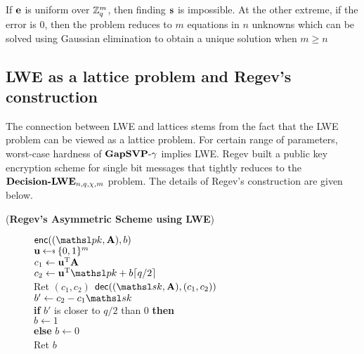\begin{remark}
If $\mathbf{e}$ is uniform over ${{\mathbb Z}}^m_q$, then finding $\mathbf{s}$ is impossible. At the other extreme, if the error is 0, then the problem reduces to $m$ equations in $n$ unknowns which can be solved using Gaussian elimination to obtain a unique solution when $m \geq n$
\end{remark}

\subsection{LWE as a lattice problem and Regev's construction}
The connection between LWE and lattices stems from the fact that 
the LWE problem can be viewed as a lattice problem. For certain range of parameters, worst-case hardness of $\textbf{GapSVP}\textnormal{-}\gamma$ implies LWE. Regev \cite{Regev2005} built a public key encryption scheme for single bit messages that tightly reduces to the $\textbf{Decision-LWE}_{n,q,\chi,m}$ problem. The details of Regev's construction are given below.

\begin{construction}
(\textbf{Regev's Asymmetric Scheme using LWE})
\begin{figure}[h]
\centering
{}
{
    \underline{$\enc((\pk,\varvect{A}), b)$}\\[1pt]
    $\varvect{u} \getsr \bits^m$\\
    $c_1 \gets \mathbf{u}^{\textnormal{T}} \mathbf{A}$\\
    $c_2 \gets \varvect{u}^{\textnormal{T}} \pk + b \lceil q/2 \rceil$\\
    Ret $(c_1, c_2)$
} 
{
    \underline{$\dec((\sk,\varvect{A}), (c_1,c_2))$}\\[1pt]
    $b' \gets c_2 - c_1 \sk$\\
    \textbf{if} $b'$ is closer to $q/2$ than 0 \textbf{then}\\
    \hspace*{1em} $b \gets 1$\\
    \textbf{else} $b \gets 0$\\
    Ret $b$
}
\end{figure}
\end{construction}

